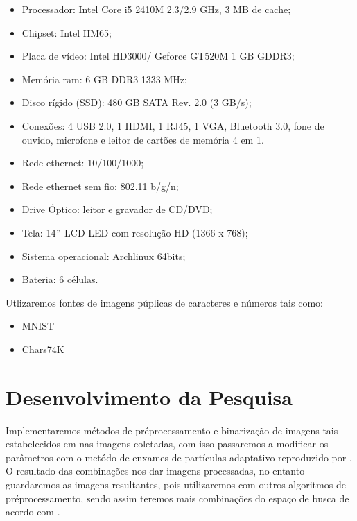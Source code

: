 \documentclass[12pt,a4paper,oneside]{book}
\newcommand\wb[1]{\discretionary{#1}{#1}{#1}}
\begin{document}
\begin{itemize}
    \item Processador: Intel Core i5 2410M 2.3/2.9 GHz, 3 MB de cache;
    \item Chipset: Intel HM65;
    \item Placa de v\'{i}deo: Intel HD3000/ Geforce GT520M 1 GB GDDR3;
    \item Mem\'{o}ria ram: 6 GB DDR3 1333 MHz;
    \item Disco r\'{i}gido (SSD): 480 GB SATA Rev. 2.0 (3 GB/s);
    \item Conex\~{o}es: 4 USB 2.0, 1 HDMI, 1 RJ45, 1 VGA, Bluetooth 3.0, fone de
        ouvido, microfone e leitor de cart\~{o}es de mem\'{o}ria 4 em 1.
    \item Rede ethernet: 10/100/1000;
    \item Rede ethernet sem fio: 802.11 b/g/n;
    \item Drive \'{O}ptico: leitor e gravador de CD/DVD;
    \item Tela: 14$"$ LCD LED com resolu\c{c}\~{a}o HD (1366 x 768);
    \item Sistema operacional: Archlinux 64bits;
    \item Bateria: 6 c\'{e}lulas.
\end{itemize}

\noindent
Utlizaremos fontes de imagens p\'{u}plicas de caracteres e n\'{u}meros tais
como:

\begin{itemize}
    \item MNIST \autocite{MNIST2010}
    \item Chars74K \autocite{CAMPOS2009}
\end{itemize}
\section{Desenvolvimento da Pesquisa}
Implementaremos m\'{e}todos de pr\'{e}\wb-processamento e binariza\c{c}\~{a}o de
imagens tais estabelecidos em \autocite{GUPTA2007} nas imagens coletadas, com
isso passaremos a modificar os par\^{a}metros com o met\'{o}do de enxames de
part\'{i}culas adaptativo reproduzido por \autocite{ZHAN2009}. O resultado das
combina\c{c}\~{o}es nos dar imagens processadas, no entanto guardaremos as
imagens resultantes, pois utilizaremos com outros algoritmos de
pr\'{e}\wb-processamento, sendo assim teremos mais combina\c{c}\~{o}es do
espa\c{c}o de busca de acordo com \autocite{KATKAR2015}.
\end{document}
